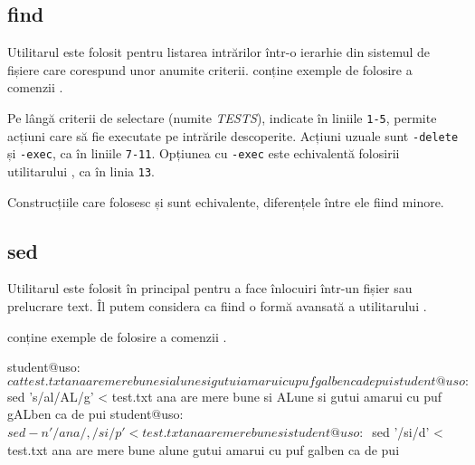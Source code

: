 \subsection{find}
\label{sec:cli:advanced:find}

Utilitarul  este folosit pentru listarea intrărilor într-o ierarhie din sistemul de fișiere care corespund unor anumite criterii.
 conține exemple de folosire a comenzii .


Pe lângă criterii de selectare (numite \textit{TESTS}), indicate în liniile \texttt{1-5},  permite acțiuni care să fie executate pe intrările descoperite.
Acțiuni uzuale sunt \texttt{-delete} și \texttt{-exec}, ca în liniile \texttt{7-11}.
Opțiunea cu \texttt{-exec} este echivalentă folosirii utilitarului , ca în linia \texttt{13}.

Construcțiile care folosesc  și  sunt echivalente, diferențele între ele fiind minore.

\subsection{sed}
\label{sec:cli:advanced:sed}

Utilitarul  este folosit în principal pentru a face înlocuiri într-un fișier sau prelucrare text.
Îl putem considera ca fiind o formă avansată a utilitarului .

 conține exemple de folosire a comenzii .

\begin{screen}[caption={Folosirea sed},label={lst:cli:sed}]
student@uso:~$ cat test.txt
ana
are
mere
bune
si
alune
si
gutui
amarui
cu
puf
galben
ca
de
pui
student@uso:~$ sed 's/al/AL/g' < test.txt
ana
are
mere
bune
si
ALune
si
gutui
amarui
cu
puf
gALben
ca
de
pui
student@uso:~$ sed -n '/ana/,/si/p' < test.txt
ana
are
mere
bune
si
student@uso:~$ sed '/si/d' < test.txt
ana
are
mere
bune
alune
gutui
amarui
cu
puf
galben
ca
de
pui
\end{screen}

